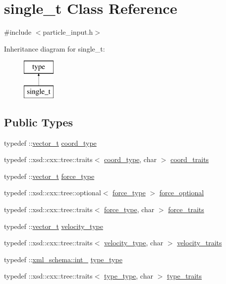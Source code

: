 \hypertarget{classsingle__t}{}\section{single\+\_\+t Class Reference}
\label{classsingle__t}


{\ttfamily \#include $<$particle\+\_\+input.\+h$>$}

Inheritance diagram for single\+\_\+t\+:\begin{figure}[H]
\begin{center}
\leavevmode
\includegraphics[height=2.000000cm]{classsingle__t}
\end{center}
\end{figure}
\subsection*{Public Types}
\begin{DoxyCompactItemize}
\item 
typedef \+::\hyperlink{classvector__t}{vector\+\_\+t} \hyperlink{classsingle__t_a07d764e683fbb0e8ddd97945f2c01270}{coord\+\_\+type}
\item 
typedef \+::xsd\+::cxx\+::tree\+::traits$<$ \hyperlink{classsingle__t_a07d764e683fbb0e8ddd97945f2c01270}{coord\+\_\+type}, char $>$ \hyperlink{classsingle__t_aaf92d8da07f04ceb7cc4dbb9a750fb41}{coord\+\_\+traits}
\item 
typedef \+::\hyperlink{classvector__t}{vector\+\_\+t} \hyperlink{classsingle__t_a1ed86c81a135e0a683e85f53b882817e}{force\+\_\+type}
\item 
typedef \+::xsd\+::cxx\+::tree\+::optional$<$ \hyperlink{classsingle__t_a1ed86c81a135e0a683e85f53b882817e}{force\+\_\+type} $>$ \hyperlink{classsingle__t_a33128be3fe89ddbab885d0a205d35888}{force\+\_\+optional}
\item 
typedef \+::xsd\+::cxx\+::tree\+::traits$<$ \hyperlink{classsingle__t_a1ed86c81a135e0a683e85f53b882817e}{force\+\_\+type}, char $>$ \hyperlink{classsingle__t_aeccb5e0ed757624999b2bb071e656aaa}{force\+\_\+traits}
\item 
typedef \+::\hyperlink{classvector__t}{vector\+\_\+t} \hyperlink{classsingle__t_a5aa793b7c32fb659668bbac250ce7d6b}{velocity\+\_\+type}
\item 
typedef \+::xsd\+::cxx\+::tree\+::traits$<$ \hyperlink{classsingle__t_a5aa793b7c32fb659668bbac250ce7d6b}{velocity\+\_\+type}, char $>$ \hyperlink{classsingle__t_ad427fe4b91c2b35163cd993438aba00a}{velocity\+\_\+traits}
\item 
typedef \+::\hyperlink{namespacexml__schema_acfa24ac68e1a188e7f44c36f7a158bf4}{xml\+\_\+schema\+::int\+\_\+} \hyperlink{classsingle__t_a6ae5872727b5902a3907ef699bcc5ee0}{type\+\_\+type}
\item 
typedef \+::xsd\+::cxx\+::tree\+::traits$<$ \hyperlink{classsingle__t_a6ae5872727b5902a3907ef699bcc5ee0}{type\+\_\+type}, char $>$ \hyperlink{classsingle__t_a5c4f2eba1499ec313d4236b4e6fb8eea}{type\+\_\+traits}
\end{DoxyCompactItemize}
